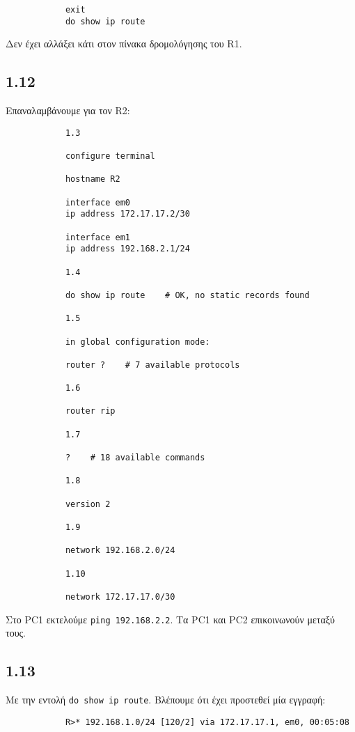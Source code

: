 \documentclass[a4paper, 12pt]{article}
\begin{document}
		\begin{verbatim}
			exit
			do show ip route
		\end{verbatim}
		
		Δεν έχει αλλάξει κάτι στον πίνακα δρομολόγησης του R1.

	\subsection*{1.12}
		Επαναλαμβάνουμε για τον R2:
		
		\begin{verbatim}
			1.3
			
			configure terminal
			
			hostname R2
			
			interface em0
			ip address 172.17.17.2/30
			
			interface em1
			ip address 192.168.2.1/24
			
			1.4
			
			do show ip route    # OK, no static records found
			
			1.5
			
			in global configuration mode: 
			
			router ?    # 7 available protocols
			
			1.6
			
			router rip
			
			1.7
			
			?    # 18 available commands
			
			1.8
			
			version 2
			
			1.9
			
			network 192.168.2.0/24
			
			1.10
			
			network 172.17.17.0/30
		\end{verbatim}
		
		Στο PC1 εκτελούμε \verb|ping 192.168.2.2|. Τα PC1 και PC2 επικοινωνούν μεταξύ τους.

	\subsection*{1.13}
		Με την εντολή \verb|do show ip route|. Βλέπουμε ότι έχει προστεθεί μία εγγραφή:
		
		\begin{verbatim}
			R>* 192.168.1.0/24 [120/2] via 172.17.17.1, em0, 00:05:08
		\end{verbatim}
\end{document}
